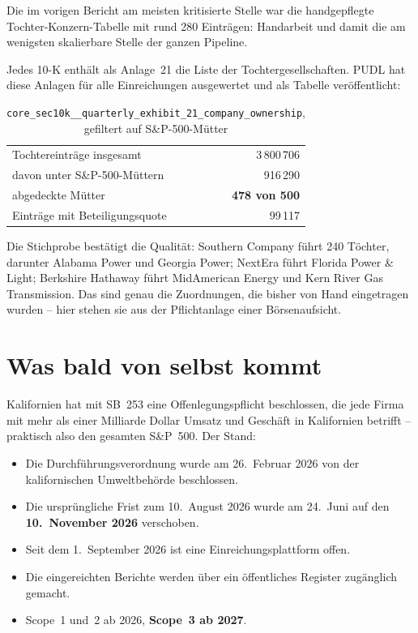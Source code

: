 \documentclass[11pt,a4paper]{article}
\begin{document}
Die im vorigen Bericht am meisten kritisierte Stelle war die handgepflegte Tochter-Konzern-Tabelle mit rund 280 Einträgen: \glqq Handarbeit und damit die am wenigsten skalierbare Stelle der ganzen Pipeline\grqq.

Jedes 10-K enthält als Anlage~21 die Liste der Tochtergesellschaften. PUDL hat diese Anlagen für alle Einreichungen ausgewertet und als Tabelle veröffentlicht:

\begin{table}[htbp]
\centering\small
\caption{\texttt{core\_sec10k\_\_quarterly\_exhibit\_21\_company\_ownership}, gefiltert auf S\&P-500-Mütter}
\label{tab:ex21}
\begin{tabular}{lr}
\toprule
Tochtereinträge insgesamt & 3\,800\,706 \\
davon unter S\&P-500-Müttern & 916\,290 \\
abgedeckte Mütter & \textbf{478 von 500} \\
Einträge mit Beteiligungsquote & 99\,117 \\
\bottomrule
\end{tabular}
\end{table}

Die Stichprobe bestätigt die Qualität: Southern Company führt 240 Töchter, darunter Alabama Power und Georgia Power; NextEra führt Florida Power \& Light; Berkshire Hathaway führt MidAmerican Energy und Kern River Gas Transmission. Das sind genau die Zuordnungen, die bisher von Hand eingetragen wurden -- hier stehen sie aus der Pflichtanlage einer Börsenaufsicht.

\section{Was bald von selbst kommt}

Kalifornien hat mit SB~253 eine Offenlegungspflicht beschlossen, die jede Firma mit mehr als einer Milliarde Dollar Umsatz und Geschäft in Kalifornien betrifft -- praktisch also den gesamten S\&P~500. Der Stand:

\begin{itemize}
\item Die Durchführungsverordnung wurde am 26.~Februar 2026 von der kalifornischen Umweltbehörde beschlossen.
\item Die ursprüngliche Frist zum 10.~August 2026 wurde am 24.~Juni auf den \textbf{10.~November 2026} verschoben.
\item Seit dem 1.~September 2026 ist eine Einreichungsplattform offen.
\item Die eingereichten Berichte werden über ein öffentliches Register zugänglich gemacht.
\item Scope~1 und~2 ab 2026, \textbf{Scope~3 ab 2027}.
\end{itemize}
\end{document}

